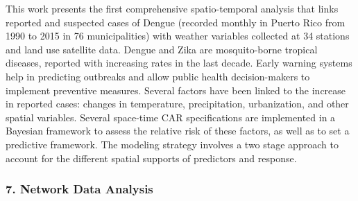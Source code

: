 \begin{itemize}
This work presents the first comprehensive spatio-temporal analysis that links reported and suspected cases of Dengue (recorded monthly in Puerto Rico from 1990 to 2015 in 76 municipalities) with weather variables collected at 34 stations and land use satellite data. Dengue and Zika are mosquito-borne tropical diseases, reported with increasing rates in the last decade. Early warning systems help in predicting outbreaks and allow public health decision-makers to implement preventive measures. Several factors have been linked to the increase in reported cases: changes in temperature, precipitation, urbanization, and other spatial variables.  Several space-time CAR specifications are implemented in a Bayesian framework to assess the relative risk of these factors, as well as to set a predictive framework. The modeling strategy involves a two stage approach to account for the different spatial supports of predictors and response. 

\end{itemize}

\subsubsection*{7. Network Data Analysis}

